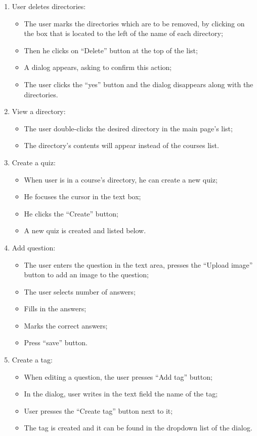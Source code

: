 \begin{enumerate}
  \item User deletes directories:
  \begin{itemize}
    \item The user marks the directories which are to be removed, by clicking on the box that is located to the left of the name of each directory; 
    \item Then he clicks on “Delete” button at the top of the list;
    \item A dialog appears, asking to confirm this action;
    \item The user clicks the “yes” button and the dialog disappears along with the directories.
  \end{itemize}

  \item View a directory:
  \begin{itemize}
    \item The user double-clicks the desired directory in the main page’s list;
    \item The directory’s contents will appear instead of the courses list.
  \end{itemize}  

  \item Create a quiz:
  \begin{itemize}
    \item When user is in a course's directory, he can create a new quiz;
    \item He focuses the cursor in the text box;
    \item He clicks the ``Create'' button;
    \item A new quiz is created and listed below.
  \end{itemize}

  \item Add question:
  \begin{itemize}
    \item The user enters the question in the text area, presses the “Upload image” button to add an image to the question;
    \item The user selects number of answers;
    \item Fills in the answers;
    \item Marks the correct answers;
    \item Press “save” button.
  \end{itemize}

  \item Create a tag:
  \begin{itemize}
    \item When editing a question, the user presses “Add tag” button;
    \item In the dialog, user writes in the text field the name of the tag;
    \item User presses the “Create tag” button next to it;
    \item The tag is created and it can be found in the dropdown list of the dialog.
  \end{itemize}


\end{enumerate}
